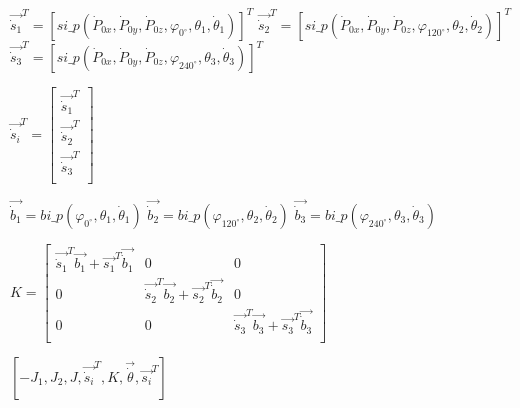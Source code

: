 \begin{algorithm}[H]
{        
               $\overrightarrow{{\dot{s}}_1}^T=[si\_p(\dot{P}_{0x},\dot{P}_{0y},\dot{P}_{0z},\varphi_{0^\circ},{\theta }_{1},\dot{\theta }_{1})]^T$\;
               $\overrightarrow{{\dot{s}}_2}^T=[si\_p(\dot{P}_{0x},\dot{P}_{0y},\dot{P}_{0z},\varphi_{120^\circ},{\theta }_{2},\dot{\theta }_{2})]^T$\;
               $\overrightarrow{{\dot{s}}_3}^T=[si\_p(\dot{P}_{0x},\dot{P}_{0y},\dot{P}_{0z},\varphi_{240^\circ},{\theta }_{3},\dot{\theta }_{3})]^T$\;


               $\overrightarrow{{\dot{s}}_i}^T= \left[\begin{matrix}
                \overrightarrow{{\dot{s}}_1}^T\\
                \overrightarrow{{\dot{s}}_2}^T\\
                \overrightarrow{{\dot{s}}_3}^T\\
                \end{matrix} \right] $\;

               $\overrightarrow{{\dot{b}}_1}=bi\_p(\varphi_{0^\circ},{\theta }_{1},\dot{\theta }_{1})$\;
               $\overrightarrow{{\dot{b}}_2}=bi\_p(\varphi_{120^\circ},{\theta }_{2},\dot{\theta }_{2})$\;
               $\overrightarrow{{\dot{b}}_3}=bi\_p(\varphi_{240^\circ},{\theta }_{3},\dot{\theta }_{3})$\;

               $K= \left[ \begin{matrix}
                \overrightarrow{\dot{s}_{1}}^{T}\overrightarrow{b_{1}}+\overrightarrow{s_{1}}^{T}\overrightarrow{\dot{b}_{1}}  &  0  &  0\\
                0  &  \overrightarrow{\dot{s}_{2}}^{T}\overrightarrow{b_{2}}+\overrightarrow{s_{2}}^{T}\overrightarrow{\dot{b}_{2}}  &  0\\
                0  &  0  &  \overrightarrow{\dot{s}_{3}}^{T}\overrightarrow{b_{3}}+\overrightarrow{s_{3}}^{T}\overrightarrow{\dot{b}_{3}}\\
                \end{matrix}
                 \right]  $\;


              \KwRet $[-J_{1},J_{2},J,\overrightarrow{{\dot{s}}_i}^T,K,\overrightarrow{\dot{\theta}},\overrightarrow{{{s}}_i}^T]$ }
        \end{algorithm}
        \newpage

